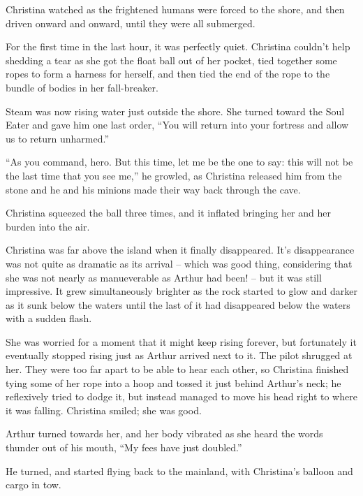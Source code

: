 \documentclass[showtrims,b6paper,draft,10pt]{memoir}
\begin{document}
Christina watched as the frightened humans were forced to the shore, and then driven onward and onward, until they were all submerged.

For the first time in the last hour, it was perfectly quiet.  Christina couldn't help shedding a tear as she got the float ball out of her pocket, tied together some ropes to form a harness for herself, and then tied the end of the rope to the bundle of bodies in her fall-breaker.

Steam was now rising water just outside the shore.  She turned toward the Soul Eater and gave him one last order, ``You will return into your fortress and allow us to return unharmed.''

``As you command, hero.  But this time, let me be the one to say:  this will not be the last time that you see me,'' he growled, as Christina released him from the stone and he and his minions made their way back through the cave.

Christina squeezed the ball three times, and it inflated bringing her and her burden into the air.

\timeskip

Christina was far above the island when it finally disappeared.  It's disappearance was not quite as dramatic as its arrival -- which was good thing, considering that she was not nearly as manueverable as Arthur had been! -- but it was still impressive.  It grew simultaneously brighter as the rock started to glow and darker as it sunk below the waters until the last of it had disappeared below the waters with a sudden flash.

She was worried for a moment that it might keep rising forever, but fortunately it eventually stopped rising just as Arthur arrived next to it.  The pilot shrugged at her.  They were too far apart to be able to hear each other, so Christina finished tying some of her rope into a hoop and tossed it just behind Arthur's neck;  he reflexively tried to dodge it, but instead managed to move his head right to where it was falling.  Christina smiled;  she was good.

Arthur turned towards her, and her body vibrated as she heard the words thunder out of his mouth, ``My fees have just doubled.''

He turned, and started flying back to the mainland, with Christina's balloon and cargo in tow.

\chapter{}

\end{document}
